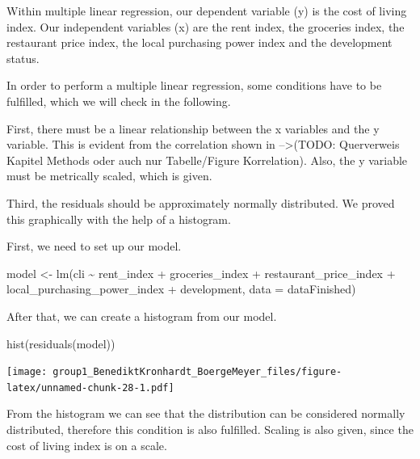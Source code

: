 \documentclass[
  11pt,
  a4paper,
  twoside]{scrbook}
\newenvironment{Shaded}{\begin{snugshade}}{\end{snugshade}}
\newcommand{\AttributeTok}[1]{\textcolor[rgb]{0.77,0.63,0.00}{#1}}
\newcommand{\FunctionTok}[1]{\textcolor[rgb]{0.00,0.00,0.00}{#1}}
\newcommand{\NormalTok}[1]{#1}
\newcommand{\OtherTok}[1]{\textcolor[rgb]{0.56,0.35,0.01}{#1}}
\newcommand{\SpecialCharTok}[1]{\textcolor[rgb]{0.00,0.00,0.00}{#1}}
\begin{document}
Within multiple linear regression, our dependent variable (y) is the cost of living index. Our independent variables (x) are the rent index, the groceries index, the restaurant price index, the local purchasing power index and the development status.

In order to perform a multiple linear regression, some conditions have to be fulfilled, which we will check in the following.

First, there must be a linear relationship between the x variables and the y variable. This is evident from the correlation shown in --\textgreater(TODO: Querverweis Kapitel Methods oder auch nur Tabelle/Figure Korrelation).
Also, the y variable must be metrically scaled, which is given.

Third, the residuals should be approximately normally distributed. We proved this graphically with the help of a histogram.

First, we need to set up our model.

\linespread{1}

\begin{Shaded}
\begin{Highlighting}[]
\NormalTok{model }\OtherTok{\textless{}{-}} \FunctionTok{lm}\NormalTok{(cli }\SpecialCharTok{\textasciitilde{}}\NormalTok{ rent\_index }\SpecialCharTok{+}\NormalTok{ groceries\_index }\SpecialCharTok{+}\NormalTok{ restaurant\_price\_index }\SpecialCharTok{+}\NormalTok{ local\_purchasing\_power\_index }\SpecialCharTok{+}\NormalTok{ development, }\AttributeTok{data =}\NormalTok{ dataFinished)}
\end{Highlighting}
\end{Shaded}

\linespread{1}

After that, we can create a histogram from our model.

\linespread{1}

\begin{Shaded}
\begin{Highlighting}[]
\FunctionTok{hist}\NormalTok{(}\FunctionTok{residuals}\NormalTok{(model))}
\end{Highlighting}
\end{Shaded}

\linespread{1}\texttt{[image: group1\_BenediktKronhardt\_BoergeMeyer\_files/figure-latex/unnamed-chunk-28-1.pdf]}

From the histogram we can see that the distribution can be considered normally distributed, therefore this condition is also fulfilled.
Scaling is also given, since the cost of living index is on a scale.
\end{document}

